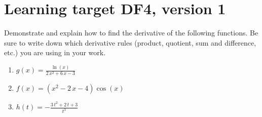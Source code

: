 \section{Learning target DF4, version 1}
\providecommand{\stxKnowl}{}\renewcommand{\stxKnowl}[1]{#1}
\providecommand{\stxOuttro}{}\renewcommand{\stxOuttro}[1]{#1}
\providecommand{\stxTitle}{}\renewcommand{\stxTitle}[1]{#1}
\renewcommand{\stxOuttro}[1]{}
\stxKnowl{
 Demonstrate and explain how to find the derivative of the following functions. Be sure to write down which derivative rules (product, quotient, sum and difference, etc.) you are using in your work. 

\begin{enumerate}
\item
\stxKnowl{
\(\renewcommand{\log}{\ln} g(x)= \frac{\log\left(x\right)}{2 \, x^{2} + 6 \, x - 3}\)

\stxOuttro{
\[\renewcommand{\log}{\ln} g' (x)= -\frac{2 \, {\left(2 \, x + 3\right)} \log\left(x\right)}{{\left(2 \, x^{2} + 6 \, x - 3\right)}^{2}} + \frac{1}{{\left(2 \, x^{2} + 6 \, x - 3\right)} x}\]

}
}
\vfill
\item
\stxKnowl{
\(\renewcommand{\log}{\ln} f(x)= {\left(x^{2} - 2 \, x - 4\right)} \cos\left(x\right)\)

\stxOuttro{
\[\renewcommand{\log}{\ln} f' (x)= 2 \, {\left(x - 1\right)} \cos\left(x\right) - {\left(x^{2} - 2 \, x - 4\right)} \sin\left(x\right)\]

}
}
\vfill
\item
\stxKnowl{
\(\renewcommand{\log}{\ln} h(t)= -\frac{3 \, t^{2} + 2 \, t + 3}{t^{3}}\)

\stxOuttro{
\[\renewcommand{\log}{\ln} h' (t)= \frac{3 \, t^{2} + 4 \, t + 9}{t^{4}}\]

}
}
\vfill
\end{enumerate}
}

\pagebreak

